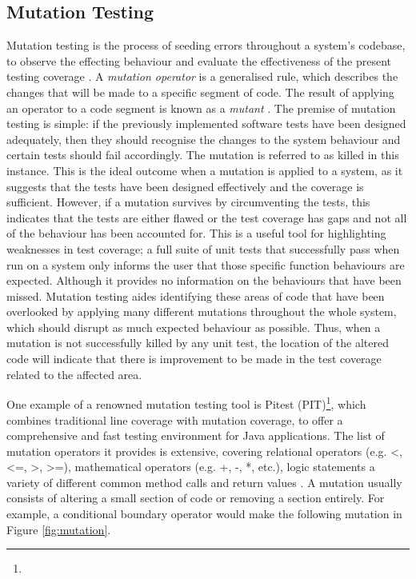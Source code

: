 \documentclass[a4paper,12pt]{article}
\begin{document}
\subsection{Mutation Testing} \label{section:Mutation Testing}
Mutation testing is the process of seeding errors throughout a system’s codebase, to observe the effecting behaviour and evaluate the effectiveness of the present testing coverage \citep{adrion81}. A \textit{mutation operator} is a generalised rule, which describes the changes that will be made to a specific segment of code. The result of applying an operator to a code segment is known as a \textit{mutant} \citep{ammann17}. The premise of mutation testing is simple: if the previously implemented software tests have been designed adequately, then they should recognise the changes to the system behaviour and certain tests should fail accordingly. The mutation is referred to as killed in this instance. This is the ideal outcome when a mutation is applied to a system, as it suggests that the tests have been designed effectively and the coverage is sufficient. However, if a mutation survives by circumventing the tests, this indicates that the tests are either flawed or the test coverage has gaps and not all of the behaviour has been accounted for. This is a useful tool for highlighting weaknesses in test coverage; a full suite of unit tests that successfully pass when run on a system only informs the user that those specific function behaviours are expected. Although it provides no information on the behaviours that have been missed. Mutation testing aides identifying these areas of code that have been overlooked by applying many different mutations throughout the whole system, which should disrupt as much expected behaviour as possible. Thus, when a mutation is not successfully killed by any unit test, the location of the altered code will indicate that there is improvement to be made in the test coverage related to the affected area.

One example of a renowned mutation testing tool is Pitest (PIT)\footnote{}, which combines traditional line coverage with mutation coverage, to offer a comprehensive and fast testing environment for Java applications. The list of mutation operators it provides is extensive, covering relational operators (e.g. \textless, \textless=, \textgreater, \textgreater=), mathematical operators (e.g. +, -, *, etc.), logic statements a variety of different common method calls and return values \citep{pit19}. A mutation usually consists of altering a small section of code or removing a section entirely. For example, a conditional boundary operator would make the following mutation  in Figure \ref{fig:mutation}. 
\end{document}
